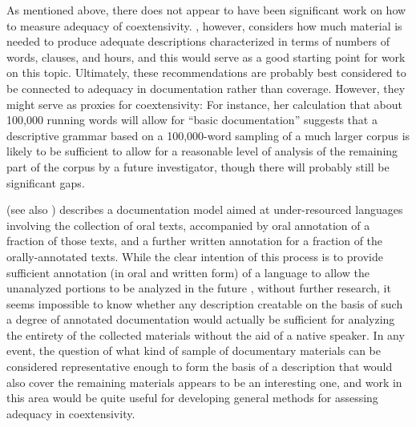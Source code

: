 As mentioned above, there does not appear to have been significant work on how
to measure adequacy of coextensivity. , however,
considers how much material is needed to produce adequate descriptions
characterized in terms of numbers of words, clauses, and hours, and this would
serve as a good starting point for work on this topic. Ultimately, these
recommendations are probably best considered to be connected to adequacy in
documentation rather than coverage. However, they might serve as proxies for
coextensivity: For instance, her calculation that about 100,000 running
words will allow for ``basic documentation'' suggests that a descriptive grammar
based on a 100,000-word sampling of a much larger corpus is likely to be
sufficient to allow for a reasonable level of analysis of the remaining part of
the corpus by a future investigator, though there will probably still be
significant gaps.

 (see also ) describes a documentation
model aimed at under-resourced languages involving the collection of oral texts,
accompanied by oral annotation of a fraction of those texts, and a further
written annotation for a fraction of the orally-annotated texts. While the clear
intention of this process is to provide sufficient annotation (in oral and
written form) of a language to allow the unanalyzed portions to be analyzed in
the future \citep[7]{Bird:2010}, without further research, it seems impossible to
know whether any description creatable on the basis of such a degree of
annotated documentation would actually be sufficient for analyzing the entirety
of the collected materials without the aid of a native speaker. In any event,
the question of what kind of sample of documentary materials can be considered
representative enough to form the basis of a description that would also cover
the remaining materials appears to be an interesting one, and work in this area
would be quite useful for developing general methods for assessing adequacy in
coextensivity.

